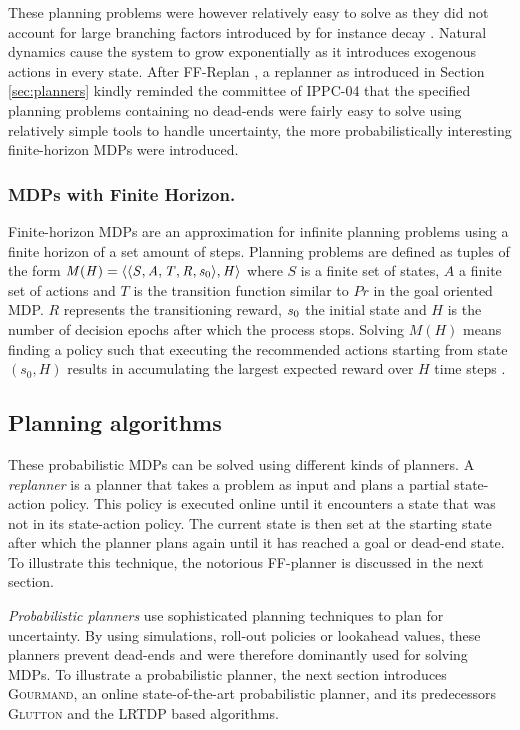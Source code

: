 \documentclass[runningheads,a4paper]{llncs}
\begin{document}
These planning problems were however relatively easy to solve as they did not account for large branching factors introduced by for instance decay \cite{kolobov2012glutton}. Natural dynamics cause the system to grow exponentially as it introduces exogenous actions in every state. After FF-Replan \cite{FFReplan}, a replanner as introduced in Section  \ref{sec:planners} kindly reminded the committee of IPPC-04 that the specified planning problems containing no dead-ends were fairly easy to solve using relatively simple tools to handle uncertainty, the more probabilistically interesting finite-horizon MDPs were introduced.

\subsubsection{MDPs with Finite Horizon. } Finite-horizon MDPs are an approximation for infinite planning problems using a finite horizon of a set amount of steps. Planning problems are defined as tuples of the form $\mathit{M(H) = \langle \langle S, A, T, R, s\textsubscript{0} \rangle , H \rangle }$ where $\mathit{S}$ is a finite set of states, $\mathit{A}$ a finite set of actions and $\mathit{T}$ is the transition function similar to $\mathit{Pr}$ in the goal oriented MDP. $\mathit{R}$ represents the transitioning reward, $\mathit{s\textsubscript{0}}$ the initial state and $\mathit{H}$ is the number of decision epochs after which the process stops. Solving $\mathit{M(H)}$ means finding a policy such that executing the recommended actions starting from state $(s_0, H)$ results in accumulating the largest expected reward over $H$ time steps \cite{kolobov2012glutton}.

\subsection{Planning algorithms}

These probabilistic MDPs can be solved using different kinds of planners. A \emph{replanner} is a planner that takes a problem as input and plans a partial state-action policy. This policy is executed online until it encounters a state that was not in its state-action policy. The current state is then set at the starting state after which the planner plans again until it has reached a goal or dead-end state. To illustrate this technique, the notorious FF-planner is discussed in the next section.

\emph{Probabilistic planners} use sophisticated planning techniques to plan for uncertainty. By using simulations, roll-out policies or lookahead values, these planners prevent dead-ends and were therefore dominantly used for solving MDPs. To illustrate a probabilistic planner, the next section introduces \textsc{Gourmand}, an online state-of-the-art probabilistic planner, and its predecessors \textsc{Glutton} and the LRTDP based algorithms.
\end{document}
